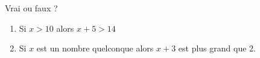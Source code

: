 
\begin{mental}
    Vrai ou faux ?
    \begin{enumerate}
        \item
            Si \( x> 10\) alors \( x+5>14\)
        \item
            Si \( x\) est un nombre quelconque alors \( x+3\) est plus grand que \( 2\).
    \end{enumerate}
\end{mental}
